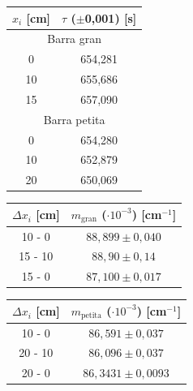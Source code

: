 \documentclass[12pt,twosides,onecolumn,openany]{article}
\newenvironment{Figura}
  {\par\medskip\noindent\minipage{\linewidth}}
  {\endminipage\par\medskip}
\begin{document}
\begin{multicols}{2}
    \begin{Figura}
      \centering
      \begin{tabular}{c|c}
        $x_i$ [cm] & $\tau$ ($\pm$0,001) [s]\\ \hline\hline
        \multicolumn{2}{c}{Barra gran}\\\hline
        0 & 654,281 \\
        10 & 655,686 \\
        15 & 657,090 \\\hline
        \multicolumn{2}{c}{Barra petita}\\\hline
        0 & 654,280 \\
        10 & 652,879 \\
        20 & 650,069
      \end{tabular}
    \end{Figura}
    \begin{Figura}
      \centering
      \begin{tabular}{c|c}
        $\Delta x_i$ [cm]  & $m_{\text{gran}}$ ($\cdot 10^{-3}$) [cm$^{-1}$]\\ \hline\hline
        10 - 0 & $88,899\pm0,040$ \\
        15 - 10 & $88,90\pm0,14$ \\
        15 - 0 & $87,100\pm0,017$
      \end{tabular}
    \end{Figura}
    \begin{Figura}
      \centering
      \begin{tabular}{c|c}
        $\Delta x_i$ [cm]  & $m_{\text{petita}}$ ($\cdot 10^{-3}$) [cm$^{-1}$]\\ \hline\hline
        10 - 0 & $86,591\pm0,037$ \\
        20 - 10 & $86,096\pm0,037$ \\
        20 - 0 & $86,3431\pm0,0093$
      \end{tabular}
    \end{Figura}
    \begin{Figura}
      \centering
      \begin{tabular}{c|c}

\end{tabular}
\end{Figura}
\end{multicols}
\end{document}
